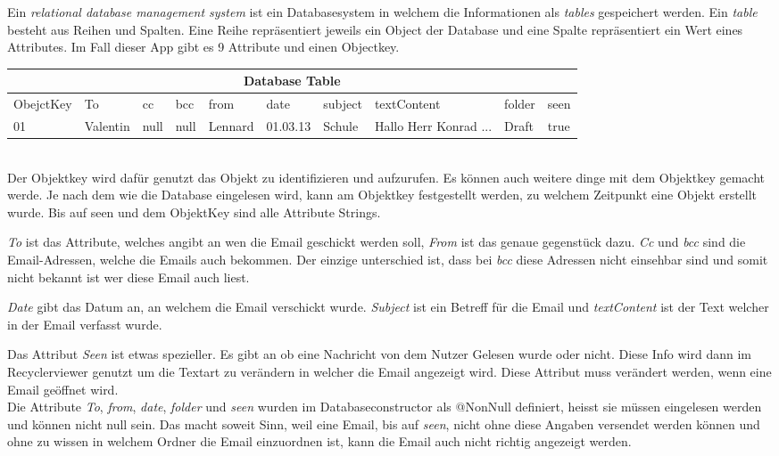 \documentclass[a4paper,11pt]{article}
\begin{document}
Ein \textit{relational database management system} ist ein Databasesystem in welchem die Informationen als \textit{tables} gespeichert werden. 
Ein \textit{table} besteht aus Reihen und Spalten. Eine Reihe repräsentiert jeweils ein Object der Database und eine Spalte repräsentiert ein Wert eines Attributes. Im Fall dieser App
gibt es 9 Attribute und einen Objectkey. \\


\begin{tabular}{ |p{1.6cm}  |p{1.1cm} |p{1.1cm} |p{1.05cm} |p{1.15cm} |p{1.15cm} |p{1.25cm} |p{1.75cm} |p{1.25cm} |p{1.15cm}|}
 \hline
 \multicolumn{10}{|c|}{Database Table} \\
 \hline
    ObejctKey &To & cc & bcc & from & date & subject & textContent & folder & seen  \\
 \hline
     01    &Valentin& null & null & Lennard & 01.03.13 & Schule &  Hallo Herr Konrad ...& Draft & true \\
 \hline
\end{tabular} \\

Der Objektkey wird dafür genutzt das Objekt zu identifizieren und aufzurufen. Es können auch weitere dinge mit dem Objektkey gemacht werde. 
Je nach dem wie die Database eingelesen wird, kann am Objektkey festgestellt werden, zu welchem Zeitpunkt eine Objekt erstellt wurde. Bis auf seen und dem ObjektKey sind 
alle Attribute Strings. 

\textit{To} ist das Attribute, welches angibt an wen die Email geschickt werden soll, \textit{From} ist das genaue gegenstück dazu. \textit{Cc} und \textit{bcc} sind die 
Email-Adressen, welche die Emails auch bekommen. Der einzige unterschied ist, dass bei \textit{bcc} diese Adressen nicht einsehbar sind und somit nicht bekannt ist wer diese Email auch liest. 

\textit{Date} gibt das Datum an, an welchem die Email verschickt wurde. \textit{Subject} ist ein Betreff für die Email und \textit{textContent} ist der Text welcher in der Email verfasst wurde. 

Das Attribut \textit{Seen} ist etwas spezieller. Es gibt an ob eine Nachricht von dem Nutzer Gelesen wurde oder nicht. Diese Info wird dann im Recyclerviewer genutzt um die Textart zu verändern
in welcher die Email angezeigt wird. Diese Attribut muss verändert werden, wenn eine Email geöffnet wird. \\

Die Attribute \textit{To}, \textit{from}, \textit{date}, \textit{folder} und \textit{seen} wurden im Databaseconstructor als @NonNull definiert, heisst sie müssen eingelesen werden und können 
nicht null sein. Das macht soweit Sinn, weil eine Email, bis auf \textit{seen}, nicht ohne diese Angaben versendet werden können und ohne zu wissen in welchem Ordner die Email einzuordnen ist,
kann die Email auch nicht richtig angezeigt werden. \\
\end{document}
